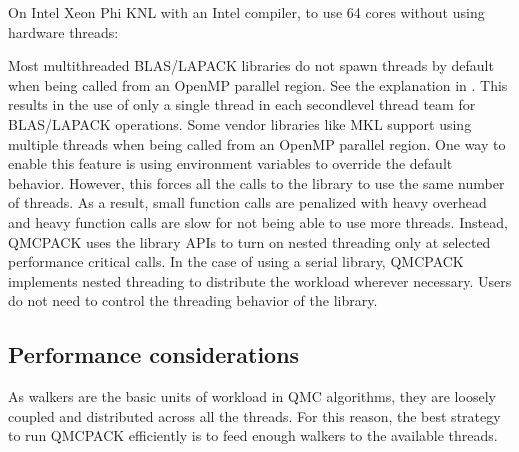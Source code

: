 \documentclass[letterpaper,10pt,english]{sphinxmanual}
\begin{document}
On Intel Xeon Phi KNL with an Intel compiler, to use 64 cores without using hardware threads:

\begin{sphinxVerbatim}[commandchars=\\\{\}]
\end{sphinxVerbatim}

Most multithreaded BLAS/LAPACK libraries do not spawn threads by default
when being called from an OpenMP parallel region. See the explanation in {\hyperref[\detokenize{installation:threadedlibrary}]{}}.
This results in the use of only a single thread in each second\sphinxhyphen{}level thread team for BLAS/LAPACK operations.
Some vendor libraries like MKL support using multiple threads when being called from an OpenMP parallel region.
One way to enable this feature is using environment variables to override the default behavior.
However, this forces all the calls to the library to use the same number of threads.
As a result, small function calls are penalized with heavy overhead and heavy function calls are slow for not being able to use more threads.
Instead, QMCPACK uses the library APIs to turn on nested threading only at selected performance critical calls.
In the case of using a serial library, QMCPACK implements nested threading to distribute the workload wherever necessary.
Users do not need to control the threading behavior of the library.


\subsection{Performance considerations}
\label{\detokenize{running:performance-considerations}}\label{\detokenize{running:cpu-performance}}
As walkers are the basic units of workload in QMC algorithms, they are loosely coupled and distributed across all the threads. For this reason, the best strategy to run QMCPACK efficiently is to feed enough walkers to the available threads.
\end{document}
